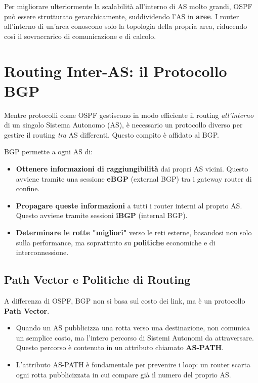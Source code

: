 Per migliorare ulteriormente la scalabilità all'interno di AS molto grandi, OSPF può essere strutturato gerarchicamente, suddividendo l'AS in \textbf{aree}. I router all'interno di un'area conoscono solo la topologia della propria area, riducendo così il sovraccarico di comunicazione e di calcolo.


\section{Routing Inter-AS: il Protocollo BGP}
Mentre protocolli come OSPF gestiscono in modo efficiente il routing \textit{all'interno} di un singolo Sistema Autonomo (AS), è necessario un protocollo diverso per gestire il routing \textit{tra} AS differenti. Questo compito è affidato al BGP.


BGP permette a ogni AS di:
\begin{itemize}
    \item \textbf{Ottenere informazioni di raggiungibilità} dai propri AS vicini. Questo avviene tramite una sessione \textbf{eBGP} (external BGP) tra i gateway router di confine.
    \item \textbf{Propagare queste informazioni} a tutti i router interni al proprio AS. Questo avviene tramite sessioni \textbf{iBGP} (internal BGP).
    \item \textbf{Determinare le rotte "migliori"} verso le reti esterne, basandosi non solo sulla performance, ma soprattutto su \textbf{politiche} economiche e di interconnessione.
\end{itemize}

\subsection{Path Vector e Politiche di Routing}
A differenza di OSPF, BGP non si basa sul costo dei link, ma è un protocollo \textbf{Path Vector}.
\begin{itemize}
    \item Quando un AS pubblicizza una rotta verso una destinazione, non comunica un semplice costo, ma l'intero percorso di Sistemi Autonomi da attraversare. Questo percorso è contenuto in un attributo chiamato \textbf{AS-PATH}.
    \item L'attributo AS-PATH è fondamentale per prevenire i loop: un router scarta ogni rotta pubblicizzata in cui compare già il numero del proprio AS.
\end{itemize}


